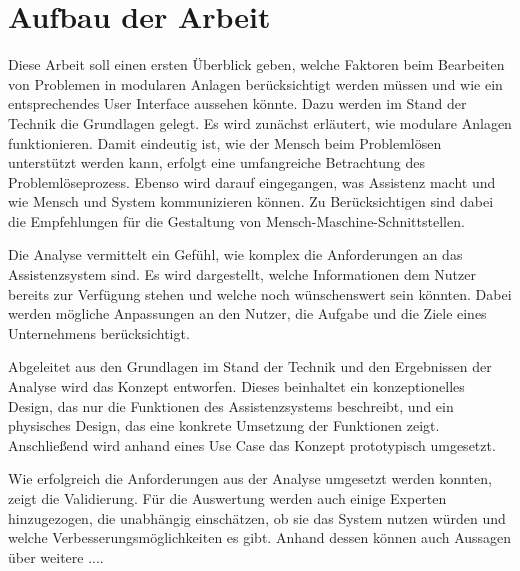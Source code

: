 \section*{Aufbau der Arbeit}
Diese Arbeit soll einen ersten Überblick geben, welche Faktoren beim Bearbeiten von Problemen in modularen Anlagen berücksichtigt werden müssen und wie ein entsprechendes User Interface aussehen könnte. Dazu werden im Stand der Technik die Grundlagen gelegt. Es wird zunächst erläutert, wie modulare Anlagen funktionieren. Damit eindeutig ist, wie der Mensch beim Problemlösen unterstützt werden kann, erfolgt eine umfangreiche Betrachtung des Problemlöseprozess. Ebenso wird darauf eingegangen, was Assistenz macht und wie Mensch und System kommunizieren können. Zu Berücksichtigen sind dabei die Empfehlungen für die Gestaltung von Mensch-Maschine-Schnittstellen.

Die Analyse vermittelt ein Gefühl, wie komplex die Anforderungen an das Assistenzsystem sind. Es wird dargestellt, welche Informationen dem Nutzer bereits zur Verfügung stehen und welche noch wünschenswert sein könnten. Dabei werden mögliche Anpassungen an den Nutzer, die Aufgabe und die Ziele eines Unternehmens berücksichtigt.

Abgeleitet aus den Grundlagen im Stand der Technik und den Ergebnissen der Analyse wird das Konzept entworfen. Dieses beinhaltet ein konzeptionelles Design, das nur die Funktionen des Assistenzsystems beschreibt, und ein physisches Design, das eine konkrete Umsetzung der Funktionen zeigt. Anschließend wird anhand eines Use Case das Konzept prototypisch umgesetzt.

Wie erfolgreich die Anforderungen aus der Analyse umgesetzt werden konnten, zeigt die Validierung. Für die Auswertung werden auch einige Experten hinzugezogen, die unabhängig einschätzen, ob sie das System nutzen würden und welche Verbesserungsmöglichkeiten es gibt. Anhand dessen können auch Aussagen über weitere ....